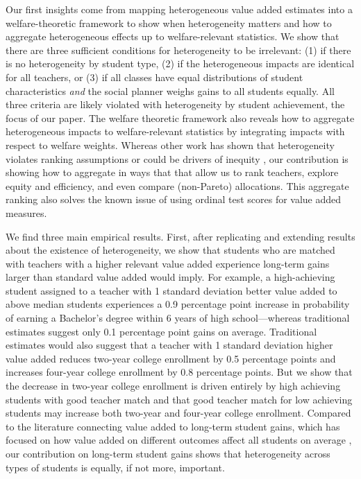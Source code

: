 \documentclass{article}
\theoremstyle{definition}
\theoremstyle{definition}
\theoremstyle{definition}
\theoremstyle{definition}
\begin{document}
    
Our first insights come from mapping heterogeneous value added estimates into a welfare-theoretic framework to show when heterogeneity matters and how to aggregate heterogeneous effects up to welfare-relevant statistics. We show that there are three sufficient conditions for heterogeneity to be irrelevant: (1) if there is no heterogeneity by student type, (2) if the heterogeneous impacts are identical for all teachers, or (3) if all classes have equal distributions of student characteristics \textit{and} the social planner weighs gains to all students equally. All three criteria are likely violated with heterogeneity by student achievement, the focus of our paper. The welfare theoretic framework also reveals how to aggregate heterogeneous impacts to welfare-relevant statistics by integrating impacts with respect to welfare weights. Whereas other work has shown that heterogeneity violates ranking assumptions \citep{condie2014teacher} or could be drivers of inequity \citep{Delgado2020,bates2022teacher}, our contribution is showing how to aggregate in ways that that allow us to rank teachers, explore equity and efficiency, and even compare (non-Pareto) allocations. This aggregate ranking also solves the known issue of using ordinal test scores for value added measures.

    
We find three main empirical results. First, after replicating and extending results about the existence of heterogeneity, we show that students who are matched with teachers with a higher relevant value added experience long-term gains larger than standard value added would imply. For example, a high-achieving student assigned to a teacher with 1 standard deviation better value added to above median students experiences a 0.9 percentage point increase in probability of earning a Bachelor's degree within 6 years of high school---whereas traditional estimates suggest only 0.1 percentage point gains on average. Traditional estimates would also suggest that a teacher with 1 standard deviation higher value added reduces two-year college enrollment by 0.5 percentage points and increases four-year college enrollment by 0.8 percentage points. But we show that the decrease in two-year college enrollment is driven entirely by high achieving students with good teacher match and that good teacher match for low achieving students may increase both two-year and four-year college enrollment. Compared to the literature connecting value added to long-term student gains, which has focused on how value added on different outcomes affect all students on average \citep{chetty2014measuring2,pope2017multidimensional,gilraine2021making}, our contribution on long-term student gains shows that heterogeneity across types of students is equally, if not more, important.
\end{document}
